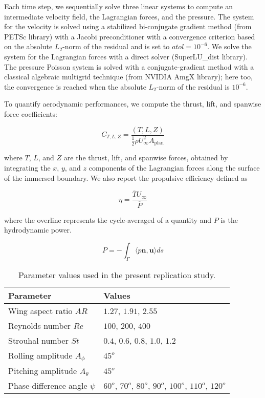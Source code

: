 Each time step, we sequentially solve three linear systems to compute an intermediate velocity field, the Lagrangian forces, and the pressure.
The system for the velocity is solved using a stabilized bi-conjugate gradient method (from PETSc library) with a Jacobi preconditioner with a convergence criterion based on the absolute $L_2$-norm of the residual and is set to $atol = 10^{-6}$.
We solve the system for the Lagrangian forces with a direct solver (SuperLU\_dist library).
The pressure Poisson system is solved with a conjugate-gradient method with a classical algebraic multigrid technique (from NVIDIA AmgX library); here too, the convergence is reached when the absolute $L_2$-norm of the residual is $10^{-6}$.

To quantify aerodynamic performances, we compute the thrust, lift, and spanwise force coefficients:

\begin{equation}
  C_{T, L, Z} = \frac{\left( T, L, Z \right)}{\frac{1}{2} \rho U_\infty^2 A_\text{plan}}
\end{equation}

where $T$, $L$, and $Z$ are the thrust, lift, and spanwise forces, obtained by integrating the $x$, $y$, and $z$ components of the Lagrangian forces along the surface of the immersed boundary.
We also report the propulsive efficiency defined as

\begin{equation}
  \eta = \frac{\overline{T} U_\infty}{\overline{P}}
\end{equation}

where the overline represents the cycle-averaged of a quantity and $P$ is the hydrodynamic power.

\begin{equation}
  P = - \int_\Gamma \langle p \mathbf{n}, \mathbf{u} \rangle ds
\end{equation}

\begin{table}
  \centering
  \begin{tabular}{ll}
    \hline\hline
    Parameter & Values \\
    \hline
    Wing aspect ratio $AR$ & $1.27$, $1.91$, $2.55$ \\
    Reynolds number $Re$ & $100$, $200$, $400$ \\
    Strouhal number $St$ & $0.4$, $0.6$, $0.8$, $1.0$, $1.2$ \\
    Rolling amplitude $A_\phi$ & $45^o$ \\
    Pitching amplitude $A_\theta$ & $45^o$ \\
    Phase-difference angle $\psi$ & $60^o$, $70^o$, $80^o$, $90^o$, $100^o$, $110^o$, $120^o$ \\
    \hline\hline
  \end{tabular}
  \caption{Parameter values used in the present replication study.}
  \label{tab:parameters}
\end{table}

